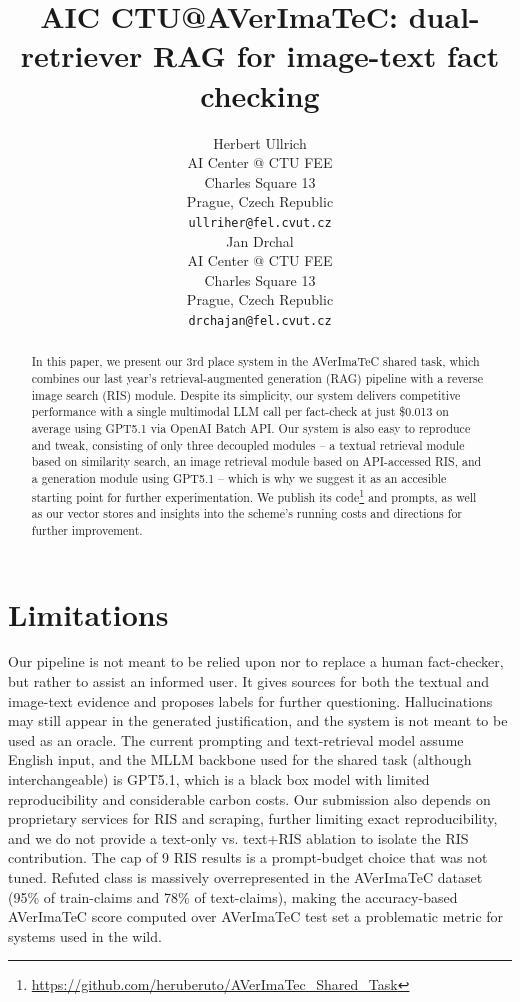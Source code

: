 \documentclass[11pt]{article}
\title{AIC CTU@AVerImaTeC: dual-retriever RAG for image-text fact checking}
\author{Herbert Ullrich \\
AI Center @ CTU FEE\\
Charles Square 13\\
Prague, Czech Republic\\
\texttt{ullriher@fel.cvut.cz} \\\And
Jan Drchal \\
AI Center @ CTU FEE\\
Charles Square 13\\
Prague, Czech Republic\\
\texttt{drchajan@fel.cvut.cz} \\}
\newcommand{\averitec}{AVerImaTeC}
\begin{document}
  \maketitle
\begin{abstract}
In this paper, we present our 3rd place system in the AVerImaTeC shared task, which combines our last year's retrieval-augmented generation (RAG) pipeline with a reverse image search (RIS) module.
Despite its simplicity, our system delivers competitive performance with a single multimodal LLM call per fact-check at just \$0.013 on average using GPT5.1 via OpenAI Batch API.
Our system is also easy to reproduce and tweak, consisting of only three decoupled modules -- a textual retrieval module based on similarity search, an image retrieval module based on API-accessed RIS, and a generation module using GPT5.1 -- which is why we suggest it as an accesible starting point for further experimentation.
We publish its code\footnote{\url{https://github.com/heruberuto/AVerImaTec\_Shared\_Task}} and prompts, as well as our vector stores and insights into the scheme's running costs and directions for further improvement.

\end{abstract}



%

%



\section*{Limitations}
Our pipeline is not meant to be relied upon nor to replace a human fact-checker, but rather to assist an informed user. It gives sources for both the textual and image-text evidence and proposes labels for further questioning. Hallucinations may still appear in the generated justification, and the system is not meant to be used as an oracle. The current prompting and text-retrieval model assume English input, and the MLLM backbone used for the shared task (although interchangeable) is GPT5.1, which is a black box model with limited reproducibility and considerable carbon costs. Our submission also depends on proprietary services for RIS and scraping, further limiting exact reproducibility, and we do not provide a text-only vs. text+RIS ablation to isolate the RIS contribution. The cap of 9 RIS results is a prompt-budget choice that was not tuned.
Refuted class is massively overrepresented in the \averitec{} dataset (95\% of train-claims and 78\% of text-claims), making the accuracy-based \averitec{} score computed over \averitec{} test set a problematic metric for systems used in the wild.
\end{document}
